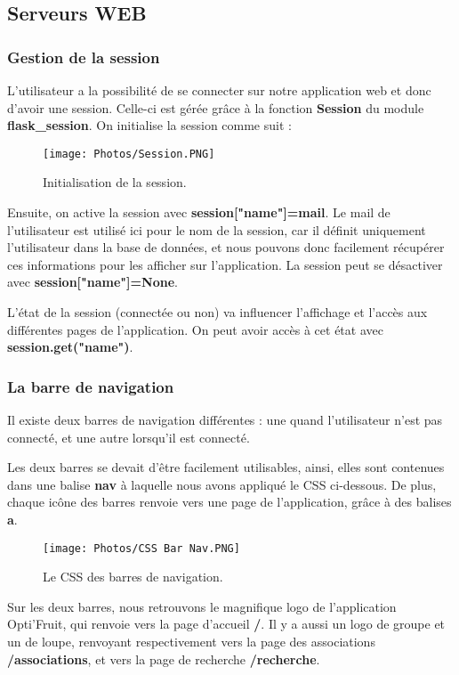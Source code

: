 \documentclass{article}
\begin{document}
\newpage
\subsection{Serveurs WEB}
\subsubsection{Gestion de la session}
L'utilisateur a la possibilité de se connecter sur notre application web et donc d'avoir une session. Celle-ci est gérée grâce à la fonction \textbf{Session} du module \textbf{flask\_session}. On initialise la session comme suit :
\begin{figure}[h!]
    \centering
    \texttt{[image: Photos/Session.PNG]}
    \caption{Initialisation de la session.}
    \label{fig:my_label}
\end{figure}


Ensuite, on active la session avec \textbf{session["name"]=mail}. Le mail de l'utilisateur est utilisé ici pour le nom de la session, car il définit uniquement l'utilisateur dans la base de données, et nous pouvons donc facilement récupérer ces informations pour les afficher sur l'application. La session peut se désactiver avec \textbf{session["name"]=None}.

L'état de la session (connectée ou non) va influencer l'affichage et l'accès aux différentes pages de l'application. On peut avoir accès à cet état avec \textbf{session.get("name")}.

        
\subsubsection{La barre de navigation}
Il existe deux barres de navigation différentes : une quand l'utilisateur n'est pas connecté, et une autre lorsqu'il est connecté.

Les deux barres se devait d'être facilement utilisables, ainsi,  elles sont contenues dans une balise \textbf{nav} à laquelle nous avons appliqué le CSS ci-dessous. De plus, chaque icône des barres renvoie vers une page de l'application, grâce à des balises \textbf{a}.

\begin{figure}[h!]
    \centering
    \texttt{[image: Photos/CSS Bar Nav.PNG]}
    \caption{Le CSS des barres de navigation.}
    \label{fig:my_label}
\end{figure}

Sur les deux barres, nous retrouvons le magnifique logo de l'application Opti'Fruit, qui renvoie vers la page d'accueil \textbf{/}. Il y a aussi un logo de groupe et un de loupe, renvoyant respectivement vers la page des associations \textbf{/associations}, et vers la page de recherche \textbf{/recherche}.
\end{document}
